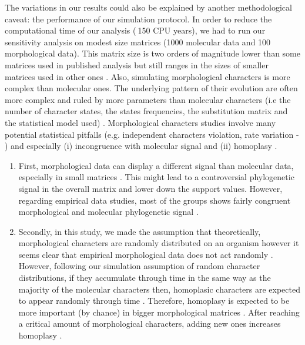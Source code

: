 \documentclass[12pt,letterpaper]{article}
\begin{document}

The variations in our results could also be explained by another methodological caveat: the performance of our simulation protocol. In order to reduce the computational time of our analysis ($~$150 CPU years), we had to run our sensitivity analysis on modest size matrices (1000 molecular data and 100 morphological data). This matrix size is two orders of magnitude lower than some matrices used in published analysis \citep[e.g.][]{springermacroevolutionary2012,nithe2013} but still ranges in the sizes of smaller matrices used in other ones \citep[e.g.][]{sallam2011craniodental,kellymolecular2014}. %
Also, simulating morphological characters is more complex than molecular ones. The underlying pattern of their evolution are often more complex and ruled by more parameters than molecular characters (i.e the number of character states, the states frequencies, the substitution matrix and the statistical model used) \citep{Pagel22011994,wagner2000,lewisa2001,wrightbayesian2014}. Morphological characters studies involve many potential statistical pitfalls (e.g. independent characters violation, rate variation - \citet{davalosintegrating2014}) and especially (i) incongruence with molecular signal and (ii) homoplasy \citep{wagner2000}.
\begin{enumerate}
\item{First, morphological data can display a different signal than molecular data, especially in small matrices \citep{wagner2000}. %
This might lead to a controversial phylogenetic signal in the overall matrix and lower down the support values. However, regarding empirical data studies, most of the groups shows fairly congruent morphological and molecular phylogenetic signal \citep[e.g.][]{leerates2013}.}
\item{Secondly, in this study, we made the assumption that theoretically, morphological characters are randomly distributed on an organism however it seems clear that empirical morphological data does not act randomly \citep{sansomfossilization2013,pattinsonphylogeny2014}. However, following our simulation assumption of random character distributions, if they accumulate through time in the same way as the majority of the molecular characters then, homoplasic characters are expected to appear randomly through time \citep{davalosintegrating2014}. Therefore, homoplasy is expected to be more important (by chance) in bigger morphological matrices \citep{davalosintegrating2014}. After reaching a critical amount of morphological characters, adding new ones increases homoplasy \citep{wagner2000}.}
\end{enumerate}
\end{document}
